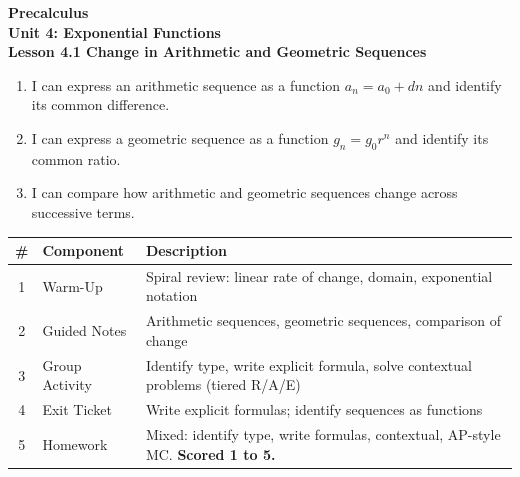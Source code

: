 \documentclass[10pt]{article}
\begin{document}
\vspace{-0.8in}

\begin{center}
  {\color{white}\textbf{\LARGE Precalculus}}\\[4pt]
  {\color{skymid}\large\textbf{Unit 4: Exponential Functions}}\\[6pt]
  {\color{white}\textbf{\large Lesson 4.1 \quad Change in Arithmetic and Geometric Sequences}}
\end{center}

\vspace{0.22in}
\namedateperiod
\vspace{0.18in}

\begin{learningtargetbox}
\small
\begin{enumerate}[leftmargin=1.5em, itemsep=5pt]
  \item I can express an arithmetic sequence as a function $a_n = a_0 + dn$ and identify its
        common difference.
  \item I can express a geometric sequence as a function $g_n = g_0 r^n$ and identify its
        common ratio.
  \item I can compare how arithmetic and geometric sequences change across successive terms.
\end{enumerate}
\end{learningtargetbox}

\vspace{0.14in}

\begin{tocbox}
\small
\renewcommand{\arraystretch}{1.5}
\begin{tabularx}{\linewidth}{@{} c l X @{}}
\rowcolor{sky}
\textbf{\#} & \textbf{Component} & \textbf{Description} \\
\midrule
1 & Warm-Up        & Spiral review: linear rate of change, domain, exponential notation \\
2 & Guided Notes   & Arithmetic sequences, geometric sequences, comparison of change \\
3 & Group Activity & Identify type, write explicit formula, solve contextual problems (tiered R/A/E) \\
4 & Exit Ticket    & Write explicit formulas; identify sequences as functions \\
5 & Homework       & Mixed: identify type, write formulas, contextual, AP-style MC. \textbf{Scored 1 to 5.} \\
\end{tabularx}
\end{tocbox}
\end{document}
